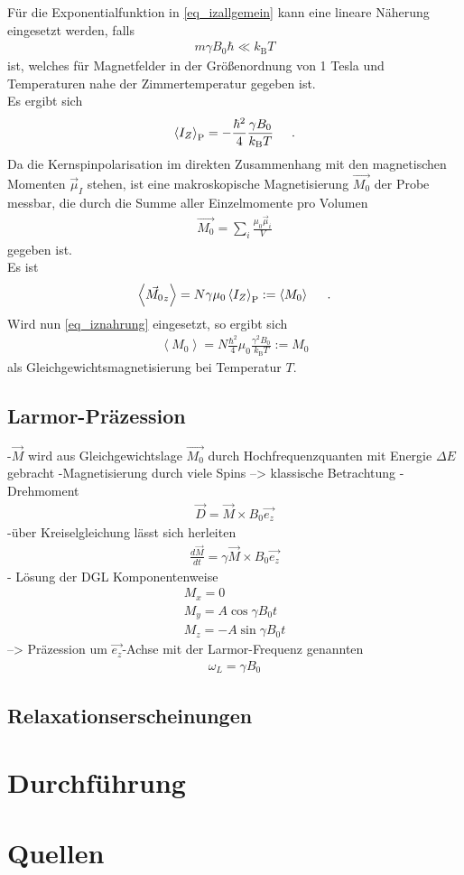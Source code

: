 \documentclass[]{scrartcl}
\begin{document}
Für die Exponentialfunktion in \ref{eq_izallgemein} kann eine lineare Näherung eingesetzt werden, falls
\begin{align}
m\gamma B_0 \hbar \ll k_\text{B}T 
\end{align}
ist, welches für Magnetfelder in der Größenordnung von 1 Tesla und Temperaturen nahe der Zimmertemperatur gegeben ist.\\
Es ergibt sich
\begin{align}
\left\langle I_Z \right\rangle_{\text{P}}= -\frac{\hbar^2}{4}\frac{\gamma B_0}{k_\text{B}T}\hspace*{0.5cm}\text{.} \label{eq_iznahrung}
\end{align}
Da die Kernspinpolarisation im direkten Zusammenhang mit den magnetischen Momenten $\vec{\mu}_I$ stehen, ist eine makroskopische Magnetisierung $\vec{M_0}$ der Probe messbar, die durch die Summe aller Einzelmomente pro Volumen
\begin{align}
\vec{M_0}=\sum\limits_{i}^{}\frac{\mu_0\vec{\mu}_i}{V}
\end{align}
gegeben ist.\\
Es ist
\begin{align}
\left\langle \vec{M_0}_z \right\rangle =N\gamma \mu_0 \left\langle I_Z \right\rangle_{\text{P}} :=\left\langle M_0 \right\rangle\hspace*{0.5cm}\text{.}
\end{align}
Wird nun \ref{eq_iznahrung} eingesetzt, so ergibt sich
\begin{align}
\left\langle M_0 \right\rangle = N\frac{\hbar^2}{4}\mu_0\frac{\gamma^2 B_0}{k_\text{B}T}:=M_0
\end{align}
als Gleichgewichtsmagnetisierung bei Temperatur $T$.
\subsection{Larmor-Präzession}
-$\vec{M}$ wird aus Gleichgewichtslage $\vec{M_0}$ durch Hochfrequenzquanten mit Energie $\Delta E$ gebracht
-Magnetisierung durch viele Spins --> klassische Betrachtung
-Drehmoment
\begin{align}
\vec{D}=\vec{M}\times B_0 \vec{e_z}
\end{align}
-über Kreiselgleichung lässt sich herleiten
\begin{align}
\frac{d \vec{M}}{d t} = \gamma \vec{M}\times B_0 \vec{e_z}
\end{align}
- Lösung der DGL Komponentenweise
\begin{align}
M_x= 0 \\
M_y= A \cos \gamma B_0 t \\
M_z= -A \sin \gamma B_0 t
\end{align}
--> Präzession um  $\vec{e_z}$-Achse mit der Larmor-Frequenz genannten
\begin{align}
\omega_L =\gamma B_0
\end{align}
\subsection{Relaxationserscheinungen}
\section{Durchführung}


\section{Quellen}
\end{document}
